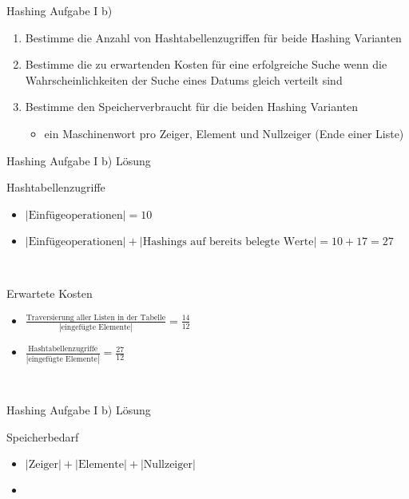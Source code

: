 	\begin{frame}{Hashing Aufgabe I b)}
		\begin{enumerate}
			\item Bestimme die Anzahl von Hashtabellenzugriffen für beide Hashing Varianten
			\item Bestimme die zu erwartenden Kosten für eine erfolgreiche Suche wenn die Wahrscheinlichkeiten der Suche eines Datums gleich verteilt sind
			\item Bestimme den Speicherverbraucht für die beiden Hashing Varianten
			\begin{itemize}
				\item ein Maschinenwort pro Zeiger, Element und Nullzeiger (Ende einer Liste) 
			\end{itemize}  
		\end{enumerate}
	\end{frame}

	\begin{frame} {Hashing Aufgabe I b) Lösung}
		\begin{block}{Hashtabellenzugriffe}
			\begin{itemize}
				\item $|\text{Einfügeoperationen}| = 10$
				\item $|\text{Einfügeoperationen}| + |\text{Hashings auf bereits belegte Werte}| = 10 + 17 = 27 $
			\end{itemize}
		\end{block}
		\ \\
		\begin{block}{Erwartete Kosten}
			\begin{itemize}
				\item $ \frac{\text{Traversierung aller Listen in der Tabelle}}{|\text{eingefügte Elemente}|}= \frac{14}{12}  $
				\item $ \frac{\text{Hashtabellenzugriffe}}{|\text{eingefügte Elemente}|} =  \frac{27}{12} $
			\end{itemize}
		\end{block}

		\ \\	


	\end{frame}

	\begin{frame}{Hashing Aufgabe I b) Lösung}
		\begin{block}{Speicherbedarf}
			\begin{itemize}
				\item $|\text{Zeiger}| + |\text{Elemente}| + |\text{Nullzeiger}|$
				\item 
			\end{itemize}
		\end{block}

	\end{frame}


